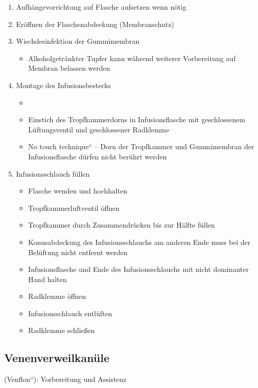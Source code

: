 \begin{enumerate}
    \item Aufhängevorrichtung auf Flasche aufsetzen wenn nötig
    \item Eröffnen der Flaschenabdeckung (Membranschutz)
    \item Wischdesinfektion der Gummimembran
    \begin{itemize}
        \item Alkoholgetränkter Tupfer kann während weiterer Vorbereitung
        auf Membran belassen werden
    \end{itemize}
    \item Montage des Infusionsbestecks
    \begin{itemize}
        \item {}
        \item Einstich des Tropfkammerdorns in Infusionsflasche mit
        geschlossenem Lüftungsventil und geschlossener Radklemme
        \item {\quotedblbase}No touch technique{\textquotedblleft} -- Dorn der
        Tropfkammer und Gummimembran der Infusionsflasche dürfen nicht
        berührt werden
    \end{itemize}
    \item Infusionsschlauch füllen
    \begin{itemize}
        \item Flasche wenden und hochhalten
        \item Tropfkammerluftventil öffnen
        \item Tropfkammer durch Zusammendrücken bis zur Hälfte füllen
        \item Konusabdeckung des Infusionsschlauchs am anderen Ende muss bei der
        Belüftung nicht entfernt werden
        \item Infusionsflasche und Ende des Infusionsschlauchs mit nicht
        dominanter Hand halten  
        \item Radklemme öffnen
        \item Infusionsschlauch entlüften
        \item Radklemme schließen
    \end{itemize}
\end{enumerate}


\subsection{Venenverweilkanüle}
({\quotedblbase}Venflon{\textquotedblleft}): Vorbereitung und Assistenz 

